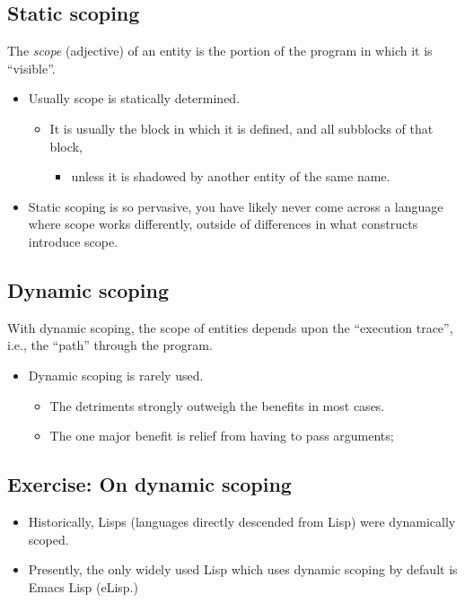 \documentclass[11pt]{article}
\theoremstyle{definition}
\begin{document}
\subsection{Static scoping}
\label{sec:orgd2c250c}
The \emph{scope} (adjective) of an entity is the portion of the program
in which it is “visible”.
\begin{itemize}
\item Usually scope is statically determined.
\begin{itemize}
\item It is usually the block in which it is defined,
and all subblocks of that block,
\begin{itemize}
\item unless it is shadowed by another entity of the same name.
\end{itemize}
\end{itemize}
\item Static scoping is so pervasive, you have likely
never come across a language where scope works differently,
outside of differences in what constructs introduce scope.
\end{itemize}

\subsection{Dynamic scoping}
\label{sec:orgae206ae}
With dynamic scoping, the scope of entities depends upon the
    “execution trace”, i.e., the “path” through the program.
\begin{itemize}
\item Dynamic scoping is rarely used.
\begin{itemize}
\item The detriments strongly outweigh the benefits in most cases.
\item The one major benefit is relief from having to pass arguments;
\end{itemize}
\end{itemize}

\subsection{Exercise: On dynamic scoping}
\label{sec:org2c12adf}
\begin{itemize}
\item Historically, Lisps (languages directly descended from Lisp)
were dynamically scoped.
\item Presently, the only widely used Lisp which uses dynamic scoping
by default is Emacs Lisp (eLisp.)
\end{itemize}
\end{document}
